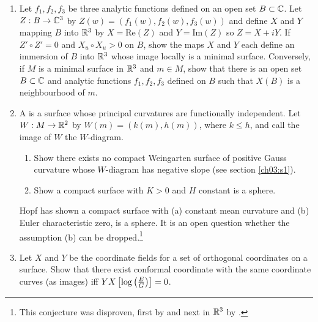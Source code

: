 \documentclass[../main]{subfiles}
\begin{document}
\begin{enumerate}
    \item\label{pro:90} Let $f_1, f_2, f_3$ be three analytic functions defined on an open set $B\subset\mathbb{C}$. Let $Z:B\to\mathbb{C}^3$ by $Z(w) = (f_1(w), f_2(w), f_3(w))$ and define $X$ and $Y$ mapping $B$ into $\mathbb{R}^3$ by $X=\mathrm{Re}(Z)$ and $Y=\mathrm{Im}(Z)$ so $Z = X+iY$. 
    If $Z'\circ Z' = 0$ and $X_u\circ X_u >0$ on $B$, show the maps $X$ and $Y$ each define an immersion of $B$ into $\mathbb{R}^3$ whose image locally is a minimal surface. Conversely, if $M$ is a minimal surface in $\mathbb{R}^3$ and $m\in M$, show that there is an open set $B\subset \mathbb{C}$ and analytic functions $f_1, f_2, f_3$ defined on $B$ such that $X(B)$ is a neighbourhood of $m$. 
    \item\label{pro:91} A  is a surface whose principal curvatures are functionally independent. Let $W:M\to \mathbb{R}^2$ by $W(m) = (k(m), h(m))$, where $k\le h$, and call the image of $W$ the $W$-diagram.
    \begin{enumerate}[label=(\roman*)]
        \item Show there exists no compact Weingarten surface of positive Gauss curvature whose $W$-diagram has negative slope (see section \ref{ch03:s1}).
        \item Show a compact surface with $K>0$ and $H$ constant is a sphere. 
    \end{enumerate}
     Hopf \cite{hopf1950uber} has shown a compact surface with (a) constant mean curvature and (b) Euler characteristic zero, is a sphere. It is an open question whether the assumption (b) can be dropped.\footnote{This conjecture was disproven, first by \cite{hsiang1982generalized} and next in $\mathbb{R}^3$ by \cite{wente1986counterexample}.}
    \item\label{pro:92} Let $X$ and $Y$ be the coordinate fields for a set of orthogonal coordinates on a surface. Show that there exist conformal coordinate with the same coordinate curves (as images) iff $YX\left[\log\left(\frac{E}{G}\right)\right] = 0$.
\end{enumerate}
\end{document}
